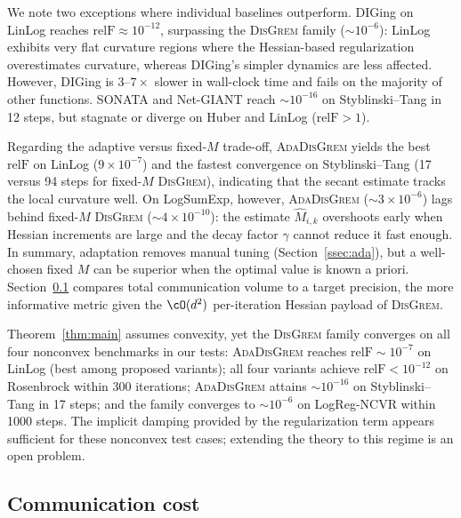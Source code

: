 \documentclass[review,onefignum,onetabnum]{siamart171218}
\begin{document}
	We note two exceptions where individual baselines outperform.
	DIGing on LinLog reaches $\mathrm{relF}\approx10^{-12}$, surpassing
	the \textsc{DisGrem} family ($\sim10^{-6}$):
	LinLog exhibits very flat curvature regions where
	the Hessian-based regularization overestimates curvature,
	whereas DIGing's simpler dynamics are less affected.
	However, DIGing is $3$--$7\times$ slower in wall-clock time
	and fails on the majority of other functions.
	SONATA and Net-GIANT reach $\sim10^{-16}$ on
	Styblinski--Tang in 12 steps, but stagnate or diverge on
	Huber and LinLog ($\mathrm{relF}>1$).
	
	Regarding the adaptive versus fixed-$M$ trade-off,
	\textsc{AdaDisGrem} yields the best $\mathrm{relF}$ on LinLog
	($9{\times}10^{-7}$) and the fastest convergence on
	Styblinski--Tang (17 versus 94 steps for fixed-$M$
	\textsc{DisGrem}), indicating that the secant estimate
	tracks the local curvature well.
	On LogSumExp, however, \textsc{AdaDisGrem}
	($\sim3{\times}10^{-6}$) lags behind fixed-$M$
	\textsc{DisGrem} ($\sim4{\times}10^{-10}$):
	the estimate $\hat M_{i,k}$ overshoots early when Hessian
	increments are large and the decay factor $\gamma$ cannot
	reduce it fast enough.
	In summary, adaptation removes manual tuning
	(Section~\ref{ssec:ada}), but a well-chosen fixed $M$ can
	be superior when the optimal value is known a priori.
	Section~\ref{ssec:commexp} compares total communication
	volume to a target precision, the more informative metric
	given the $\cO(d^2)$ per-iteration Hessian payload of \textsc{DisGrem}.
	
	Theorem~\ref{thm:main} assumes convexity, yet the \textsc{DisGrem}
	family converges on all four nonconvex benchmarks in our tests:
	\textsc{AdaDisGrem} reaches $\mathrm{relF}\sim10^{-7}$ on LinLog (best
	among proposed variants); all four variants achieve
	$\mathrm{relF}<10^{-12}$ on Rosenbrock within 300 iterations;
	\textsc{AdaDisGrem} attains $\sim10^{-16}$ on Styblinski--Tang in
	17 steps; and the family converges to $\sim10^{-6}$ on
	LogReg-NCVR within 1000 steps.
	The implicit damping provided by the regularization term appears
	sufficient for these nonconvex test cases; extending the theory
	to this regime is an open problem.
	
	\FloatBarrier
	\subsection{Communication cost}\label{ssec:commexp}
	
\end{document}
